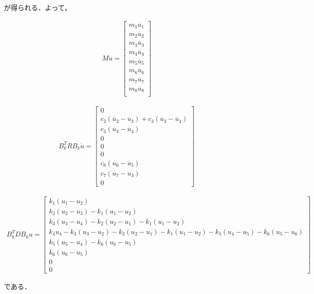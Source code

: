 が得られる．よって，

\begin{eqnarray}
    M\ddot{u} =
    \left[\begin{matrix}
        m_1 \ddot{u_1} \\
        m_2 \ddot{u_2} \\
        m_3 \ddot{u_3} \\
        m_4 \ddot{u_4} \\
        m_5 \ddot{u_5} \\
        m_6 \ddot{u_6} \\
        m_7 \ddot{u_7} \\
        m_8 \ddot{u_8} \\
    \end{matrix}\right]
\end{eqnarray}

\begin{eqnarray}
    B_k^T R B_k \dot{u} =
    \left[\begin{matrix}
        0 \\
        c_2 (\dot{u_2} - \dot{u_3}) + c_3 (\dot{u_3} - \dot{u_4}) \\
        c_3 (\dot{u_3} - \dot{u_4}) \\
        0 \\
        0 \\
        0 \\
        c_6 (\dot{u_6} - \dot{u_5}) \\
        c_7 (\dot{u_7} - \dot{u_3}) \\
        0
    \end{matrix}\right]
\end{eqnarray}

\begin{eqnarray}
    B_k^T D B_k u =
    \left[\begin{matrix}
        k_1 (u_1 - u_2) \\
        k_2 (u_2 - u_3) - k_1 (u_1 - u_2) \\
        k_3 (u_3 - u_4) - k_2 (u_2 - u_1) - k_1 (u_1 - u_2) \\
        k_4 u_4 - k_3 (u_3 - u_2) - k_2 (u_2 - u_1) - k_1 (u_1 - u_2) - k_5 (u_4 - u_5) - k_6 (u_5 - u_6) \\
        k_5 (u_5 - u_4) - k_6 (u_6 - u_5) \\
        k_6 (u_6 - u_5) \\
        0 \\
        0
    \end{matrix}\right]
\end{eqnarray}

である．
